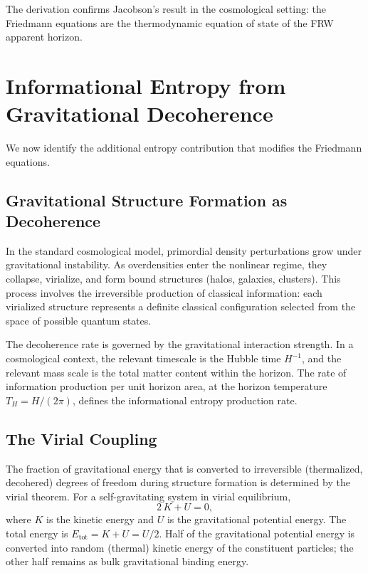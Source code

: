 \documentclass[11pt]{article}
\begin{document}
The derivation confirms Jacobson's result in the cosmological setting:
the Friedmann equations are the thermodynamic equation of state of the
FRW apparent horizon.


\section{Informational Entropy from Gravitational Decoherence}
\label{sec:sinfo}

We now identify the additional entropy contribution that modifies the
Friedmann equations.

\subsection{Gravitational Structure Formation as Decoherence}

In the standard cosmological model, primordial density perturbations grow
under gravitational instability.  As overdensities enter the nonlinear regime,
they collapse, virialize, and form bound structures (halos, galaxies,
clusters).  This process involves the irreversible production of classical
information: each virialized structure represents a definite classical
configuration selected from the space of possible quantum states.

The decoherence rate is governed by the gravitational interaction strength.
In a cosmological context, the relevant timescale is the Hubble time $H^{-1}$,
and the relevant mass scale is the total matter content within the horizon.
The rate of information production per unit horizon area, at the horizon
temperature $T_H = H/(2\pi)$, defines the informational entropy production
rate.

\subsection{The Virial Coupling}

The fraction of gravitational energy that is converted to irreversible
(thermalized, decohered) degrees of freedom during structure formation is
determined by the virial theorem.  For a self-gravitating system in virial
equilibrium,
\begin{equation}
2\,K + U = 0,
\label{eq:virial}
\end{equation}
where $K$ is the kinetic energy and $U$ is the gravitational potential energy.
The total energy is $E_\mathrm{tot} = K + U = U/2$.  Half of the gravitational
potential energy is converted into random (thermal) kinetic energy of the
constituent particles; the other half remains as bulk gravitational binding
energy.
\end{document}
